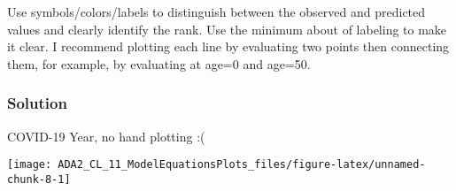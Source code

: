 \documentclass[
  12pt,
]{article}
\begin{document}
Use symbols/colors/labels to distinguish between the observed and
predicted values and clearly identify the rank. Use the minimum about of
labeling to make it clear. I recommend plotting each line by evaluating
two points then connecting them, for example, by evaluating at age=0 and
age=50.

\hypertarget{solution-5}{%
\subsubsection{Solution}\label{solution-5}}

COVID-19 Year, no hand plotting :(

\begin{center}\texttt{[image: ADA2\_CL\_11\_ModelEquationsPlots\_files/figure-latex/unnamed-chunk-8-1]} \end{center}
\end{document}
